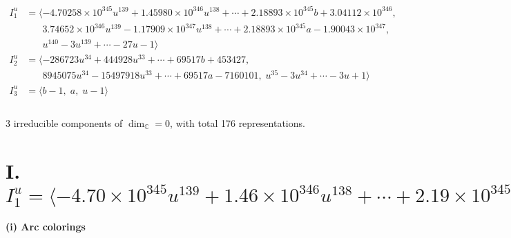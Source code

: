 \documentclass[1p]{elsarticle_modified}
\theoremstyle{definition}
\begin{document}
\begin{align*}
I^u_{1}&=\langle 
-4.70258\times10^{345} u^{139}+1.45980\times10^{346} u^{138}+\cdots+2.18893\times10^{345} b+3.04112\times10^{346},\\
\phantom{I^u_{1}}&\phantom{= \langle  }3.74652\times10^{346} u^{139}-1.17909\times10^{347} u^{138}+\cdots+2.18893\times10^{345} a-1.90043\times10^{347},\\
\phantom{I^u_{1}}&\phantom{= \langle  }u^{140}-3 u^{139}+\cdots-27 u-1\rangle \\
I^u_{2}&=\langle 
-286723 u^{34}+444928 u^{33}+\cdots+69517 b+453427,\\
\phantom{I^u_{2}}&\phantom{= \langle  }8945075 u^{34}-15497918 u^{33}+\cdots+69517 a-7160101,\;u^{35}-3 u^{34}+\cdots-3 u+1\rangle \\
I^u_{3}&=\langle 
b-1,\;a,\;u-1\rangle \\
\\
\end{align*}
\raggedright * 3 irreducible components of $\dim_{\mathbb{C}}=0$, with total 176 representations.\\
\newpage
\renewcommand{\arraystretch}{1}
\centering \section*{I. $I^u_{1}= \langle -4.70\times10^{345} u^{139}+1.46\times10^{346} u^{138}+\cdots+2.19\times10^{345} b+3.04\times10^{346},\;3.75\times10^{346} u^{139}-1.18\times10^{347} u^{138}+\cdots+2.19\times10^{345} a-1.90\times10^{347},\;u^{140}-3 u^{139}+\cdots-27 u-1 \rangle$}
\flushleft \textbf{(i) Arc colorings}\\
\end{document}

